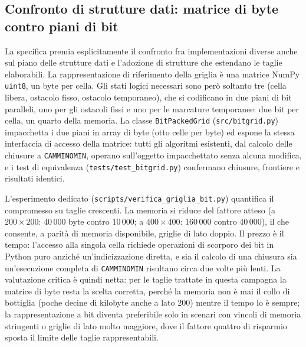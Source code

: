 \subsection{Confronto di strutture dati: matrice di byte contro piani di bit}
\label{sec:bitgrid}

La specifica premia esplicitamente il confronto fra implementazioni diverse anche sul piano delle strutture dati e l'adozione di strutture che estendano le taglie elaborabili. La rappresentazione di riferimento della griglia è una matrice NumPy \texttt{uint8}, un byte per cella. Gli stati logici necessari sono però soltanto tre (cella libera, ostacolo fisso, ostacolo temporaneo), che si codificano in due piani di bit paralleli, uno per gli ostacoli fissi e uno per le marcature temporanee: due bit per cella, un quarto della memoria. La classe \texttt{BitPackedGrid} (\texttt{src/bitgrid.py}) impacchetta i due piani in array di byte (otto celle per byte) ed espone la stessa interfaccia di accesso della matrice: tutti gli algoritmi esistenti, dal calcolo delle chiusure a \texttt{CAMMINOMIN}, operano sull'oggetto impacchettato senza alcuna modifica, e i test di equivalenza (\texttt{tests/test\_bitgrid.py}) confermano chiusure, frontiere e risultati identici.

L'esperimento dedicato (\texttt{scripts/verifica\_griglia\_bit.py}) quantifica il compromesso su taglie crescenti. La memoria si riduce del fattore atteso (a $200 \times 200$: $40\,000$ byte contro $10\,000$; a $400 \times 400$: $160\,000$ contro $40\,000$), il che consente, a parità di memoria disponibile, griglie di lato doppio. Il prezzo è il tempo: l'accesso alla singola cella richiede operazioni di scorporo dei bit in Python puro anziché un'indicizzazione diretta, e sia il calcolo di una chiusura sia un'esecuzione completa di \texttt{CAMMINOMIN} risultano circa due volte più lenti. La valutazione critica è quindi netta: per le taglie trattate in questa campagna la matrice di byte resta la scelta corretta, perché la memoria non è mai il collo di bottiglia (poche decine di kilobyte anche a lato $200$) mentre il tempo lo è sempre; la rappresentazione a bit diventa preferibile solo in scenari con vincoli di memoria stringenti o griglie di lato molto maggiore, dove il fattore quattro di risparmio sposta il limite delle taglie rappresentabili.
